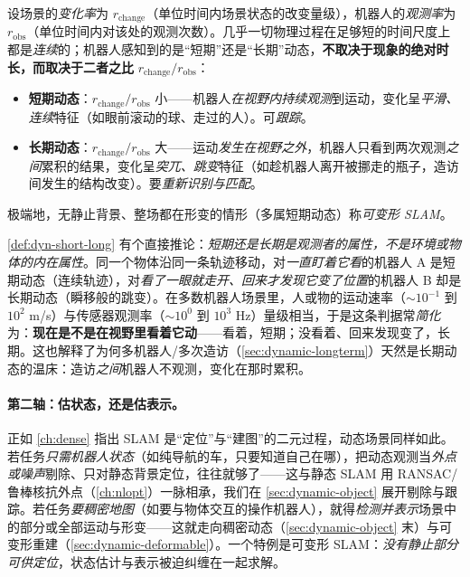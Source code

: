\begin{definition}\label{def:dyn-short-long}
设场景的\emph{变化率}为 $r_{\mathrm{change}}$（单位时间内场景状态的改变量级），机器人的\emph{观测率}为 $r_{\mathrm{obs}}$（单位时间内对该处的观测次数）。几乎一切物理过程在足够短的时间尺度上都是\emph{连续}的；机器人感知到的是“短期”还是“长期”动态，\textbf{不取决于现象的绝对时长，而取决于二者之比} $r_{\mathrm{change}}/r_{\mathrm{obs}}$：
\begin{itemize}
  \item \textbf{短期动态}：$r_{\mathrm{change}}/r_{\mathrm{obs}}$ 小——机器人\emph{在视野内持续观测}到运动，变化呈\emph{平滑、连续}特征（如眼前滚动的球、走过的人）。可\emph{跟踪}。
  \item \textbf{长期动态}：$r_{\mathrm{change}}/r_{\mathrm{obs}}$ 大——运动\emph{发生在视野之外}，机器人只看到两次观测\emph{之间}累积的结果，变化呈\emph{突兀、跳变}特征（如趁机器人离开被挪走的瓶子，造访间发生的结构改变）。要\emph{重新识别与匹配}。
\end{itemize}
极端地，无静止背景、整场都在形变的情形（多属短期动态）称\emph{可变形 SLAM}。
\end{definition}

\begin{insight}
\cref{def:dyn-short-long} 有个直接推论：\emph{短期还是长期是观测者的属性，不是环境或物体的内在属性}\cite{schmid2026dynamic}。同一个物体沿同一条轨迹移动，对\emph{一直盯着它看}的机器人 A 是短期动态（连续轨迹），对\emph{看了一眼就走开、回来才发现它变了位置}的机器人 B 却是长期动态（瞬移般的跳变）。在多数机器人场景里，人或物的运动速率（$\sim 10^{-1}$ 到 $10^{2}$ m/s）与传感器观测率（$\sim 10^{0}$ 到 $10^{3}$ Hz）量级相当，于是这条判据常\emph{简化}为：\textbf{现在是不是在视野里看着它动}——看着，短期；没看着、回来发现变了，长期。这也解释了为何多机器人/多次造访（\cref{sec:dynamic-longterm}）天然是长期动态的温床：造访\emph{之间}机器人不观测，变化在那时累积。
\end{insight}

\paragraph{第二轴：估状态，还是估表示。}
正如 \cref{ch:dense} 指出 SLAM 是“定位”与“建图”的二元过程，动态场景同样如此。若任务\emph{只需机器人状态}（如纯导航的车，只要知道自己在哪），把动态观测当\emph{外点或噪声}剔除、只对静态背景定位，往往就够了——这与静态 SLAM 用 RANSAC/鲁棒核抗外点（\cref{ch:nlopt}）一脉相承，我们在 \cref{sec:dynamic-object} 展开剔除与跟踪。若任务\emph{要稠密地图}（如要与物体交互的操作机器人），就得\emph{检测并表示}场景中的部分或全部运动与形变——这就走向稠密动态（\cref{sec:dynamic-object} 末）与可变形重建（\cref{sec:dynamic-deformable}）。一个特例是可变形 SLAM：\emph{没有静止部分可供定位}，状态估计与表示被迫纠缠在一起求解。

